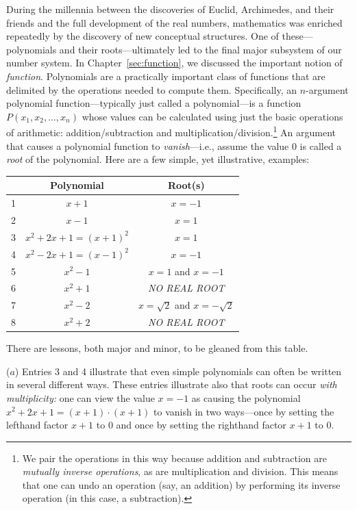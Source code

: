 During the millennia between the discoveries of Euclid, Archimedes, and
their friends and the full development of the real numbers,
mathematics was enriched repeatedly by the discovery of new conceptual
structures.  One of these---polynomials
and their
%
roots---ultimately led to the final major subsystem of our number
system.  In Chapter~\ref{sec:function}, we discussed the important
notion of {\em function}.  Polynomials  are a
practically important class of functions that are delimited by the
operations needed to compute them.  Specifically, an $n$-argument
polynomial function---typically just called a polynomial---is a
function $P(x_1, x_2, \ldots, x_n)$ whose values can be calculated
using just the basic operations of arithmetic: addition/subtraction
and multiplication/division.\footnote{We pair the operations in this
  way because addition and subtraction are {\em mutually inverse
  operations},
 as are multiplication and division.  This means that one can undo an
 operation (say, an addition) by performing its inverse operation (in
 this case, a subtraction).}
An argument that causes a polynomial function to {\it vanish}---i.e.,
assume the value $0$ is called a {\it root} of the polynomial.
Here are a few simple, yet illustrative, examples:

\smallskip

\begin{tabular}{|c|c|c|}
\hline
 & Polynomial & Root(s) \\
\hline
1 &
$x+1$  &  $x= -1$ \\
2 &
$x-1$  &  $x= 1$ \\
3 &
$x^2 + 2x +1 = (x+1)^2$ & $x = 1$ \\ 
4 &
$x^2 - 2x +1 = (x-1)^2$ & $x = -1$ \\ 
5 &
$x^2 - 1$ & $x = 1$ and $x= -1$ \\
6 &
$x^2 + 1$ & {\em NO REAL ROOT} \\
7 &
$x^2 -2$  & $x = \sqrt{2}$ and $x = - \sqrt{2}$ \\
8 &
$x^2 + 2$ & {\em NO REAL ROOT} \\
\hline
\end{tabular}

\smallskip

\noindent
There are lessons, both major and minor, to be gleaned from this
table.

\noindent
($a$) Entries 3 and 4 illustrate that even simple polynomials can often be
written in several different ways.  These entries illustrate also that
roots can occur {\em with multiplicity:}
one can view the value $x = -1$ as causing the polynomial $x^2 + 2x +1
= (x+1)\cdot (x+1)$ to vanish in two ways---once by setting the
lefthand factor $x+1$ to $0$ and once by setting the righthand factor
$x+1$ to $0$.

